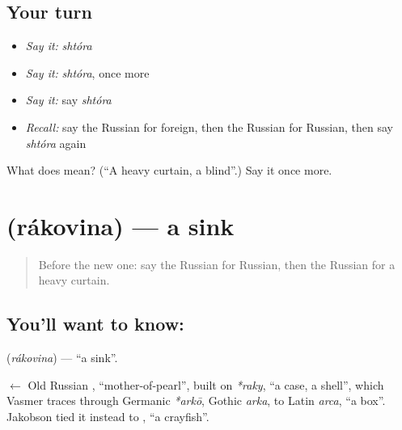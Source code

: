 \subsection*{Your turn}
\begin{itemize}
\raggedright
  \item \emph{Say it:} \emph{shtóra}
  \item \emph{Say it:} \emph{shtóra}, once more
  \item \emph{Say it:} say \emph{shtóra}
  \item \emph{Recall:} say the Russian for foreign, then the Russian for Russian, then say \emph{shtóra} again
\end{itemize}

\begin{tcolorbox}[breakable,colback=teal!4,colframe=teal!35!black,title={Before you move on}]
What does  mean? (\textquotedblleft{}A heavy curtain, a blind\textquotedblright{}.) Say it once more.
\end{tcolorbox}
\section[\texorpdfstring{\ru{раковина} (rákovina)}{раковина (rákovina)}]{ (rákovina) — a sink}

\label{lesson:RU-C190-rakovina}



\begin{quote}
Before the new one: say the Russian for Russian, then the Russian for a heavy curtain.
\end{quote}

\subsection*{You'll want to know: }
\textbf{} (\emph{rákovina}) — \textquotedblleft{}a sink\textquotedblright{}.

\begin{cousinweb}
\textbf{} $\leftarrow$ Old Russian \emph{}, \textquotedblleft{}mother-of-pearl\textquotedblright{}, built on \emph{*raky}, \textquotedblleft{}a case, a shell\textquotedblright{}, which Vasmer traces through Germanic \emph{*arkō}, Gothic \emph{arka}, to Latin \emph{arca}, \textquotedblleft{}a box\textquotedblright{}. Jakobson tied it instead to \emph{}, \textquotedblleft{}a crayfish\textquotedblright{}.
\end{cousinweb}

